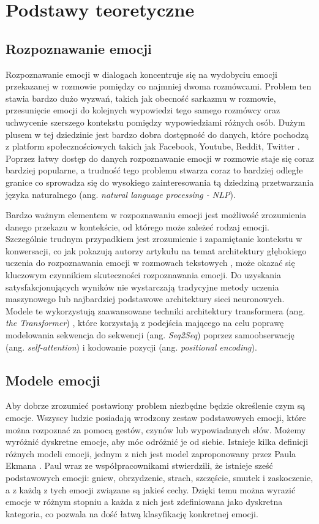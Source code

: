 \chapter{Podstawy teoretyczne}

\section{Rozpoznawanie emocji}

Rozpoznawanie emocji w dialogach koncentruje się na wydobyciu emocji przekazanej w rozmowie pomiędzy co najmniej dwoma rozmówcami. Problem ten stawia bardzo dużo wyzwań, takich jak obecność sarkazmu w rozmowie, przesunięcie emocji do kolejnych wypowiedzi tego samego rozmówcy oraz uchwycenie szerszego kontekstu pomiędzy wypowiedziami różnych osób. Dużym plusem w tej dziedzinie jest bardzo dobra dostępność do danych, które pochodzą z platform społecznościowych takich jak Facebook, Youtube, Reddit, Twitter \cite{poria2019emotion}. Poprzez łatwy dostęp do danych rozpoznawanie emocji w rozmowie staje się coraz bardziej popularne, a trudność tego problemu stwarza coraz to bardziej odległe granice co sprowadza się do wysokiego zainteresowania tą dziedziną przetwarzania języka naturalnego (ang. \textit{natural language processing - NLP}).

Bardzo ważnym elementem w rozpoznawaniu emocji jest możliwość zrozumienia danego przekazu w kontekście, od którego może zależeć rodzaj emocji. Szczególnie trudnym przypadkiem jest zrozumienie i zapamiętanie kontekstu w konwersacji, co jak pokazują autorzy artykułu na temat architektury głębokiego uczenia do rozpoznawania emocji w rozmowach tekstowych \cite{zhong2019knowledgeenriched}, może okazać się kluczowym czynnikiem skuteczności rozpoznawania emocji. Do uzyskania satysfakcjonujących wyników nie wystarczają tradycyjne metody uczenia maszynowego lub najbardziej podstawowe architektury sieci neuronowych. Modele te wykorzystują zaawansowane techniki architektury transformera (ang. \textit{the Transformer}) \cite{vaswani2017attention}, które korzystają z podejścia mającego na celu poprawę modelowania sekwencja do sekwencji (ang. \textit{Seq2Seq}) poprzez samoobserwację (ang. \textit{self-attention}) i kodowanie pozycji (ang. \textit{positional encoding}).

\section{Modele emocji}

Aby dobrze zrozumieć postawiony problem niezbędne będzie określenie czym są emocje. Wszyscy ludzie posiadają wrodzony zestaw podstawowych emocji, które można rozpoznać za pomocą gestów, czynów lub wypowiadanych słów. Możemy wyróżnić dyskretne emocje, aby móc odróżnić je od siebie. Istnieje kilka definicji różnych modeli emocji, jednym z nich jest model zaproponowany przez Paula Ekmana \cite{ekman1993facial}. Paul wraz ze współpracownikami stwierdzili, że istnieje sześć podstawowych emocji: gniew, obrzydzenie, strach, szczęście, smutek i zaskoczenie, a z każdą z tych emocji związane są jakieś cechy. Dzięki temu można wyrazić emocje w różnym stopniu a każda z nich jest zdefiniowana jako dyskretna kategoria, co pozwala na dość łatwą klasyfikację konkretnej emocji.

